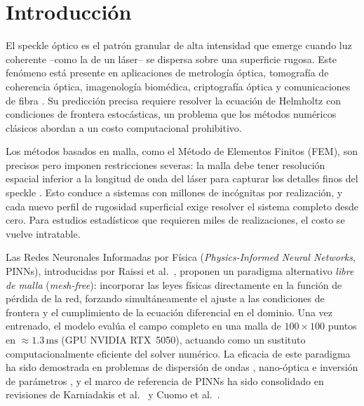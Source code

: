 
\section{Introducción}
\label{sec:intro}

El speckle óptico es el patrón granular de alta intensidad que emerge cuando luz coherente
--como la de un láser-- se dispersa sobre una superficie rugosa.
Este fenómeno está presente en aplicaciones de metrología óptica, tomografía de coherencia
óptica, imagenología biomédica, criptografía óptica y comunicaciones de fibra
\cite{Goodman2007_Speckle}.
Su predicción precisa requiere resolver la ecuación de Helmholtz con condiciones de frontera
estocásticas, un problema que los métodos numéricos clásicos abordan a un costo computacional
prohibitivo.

Los métodos basados en malla, como el Método de Elementos Finitos (FEM), son precisos pero
imponen restricciones severas: la malla debe tener resolución espacial inferior a la longitud
de onda del láser para capturar los detalles finos del speckle \cite{Jin2014_FEM}.
Esto conduce a sistemas con millones de incógnitas por realización, y cada nuevo perfil de
rugosidad superficial exige resolver el sistema completo desde cero.
Para estudios estadísticos que requieren miles de realizaciones, el costo se vuelve intratable.

Las Redes Neuronales Informadas por Física (\textit{Physics-Informed Neural Networks},
PINNs), introducidas por Raissi et al.~\cite{Raissi2019_PINNs}, proponen un paradigma alternativo
\textit{libre de malla} (\textit{mesh-free}): incorporar las leyes físicas directamente en la
función de pérdida de la red, forzando simultáneamente el ajuste a las condiciones de frontera
y el cumplimiento de la ecuación diferencial en el dominio.
Una vez entrenado, el modelo evalúa el campo completo en una malla de
$100 \times 100$ puntos en $\approx 1.3\,\mathrm{ms}$ (GPU NVIDIA RTX~5050),
actuando como un sustituto computacionalmente eficiente del solver numérico.
La eficacia de este paradigma ha sido demostrada en problemas de dispersión de ondas
\cite{Fang2020_scattering}, nano-óptica e inversión de parámetros
\cite{Chen2020_nanoptics}, y el marco de referencia de PINNs ha sido consolidado
en revisiones de Karniadakis et al.~\cite{Karniadakis2021_review} y Cuomo et al.~\cite{Cuomo2022_review}.

